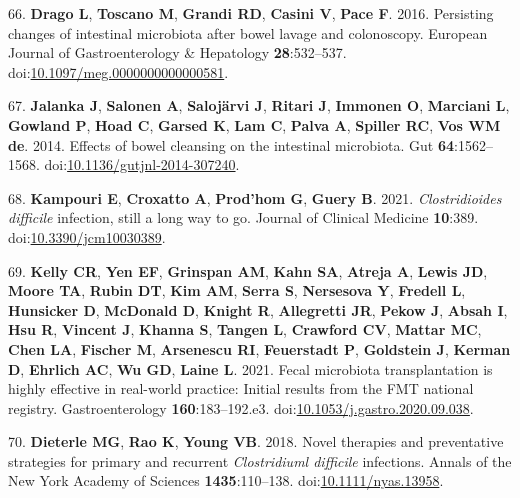 \documentclass[
  11pt,
]{article}
\begin{document}
\leavevmode\hypertarget{ref-Drago2016}{}%
66. \textbf{Drago L}, \textbf{Toscano M}, \textbf{Grandi RD},
\textbf{Casini V}, \textbf{Pace F}. 2016. Persisting changes of
intestinal microbiota after bowel lavage and colonoscopy. European
Journal of Gastroenterology \& Hepatology \textbf{28}:532--537.
doi:\href{https://doi.org/10.1097/meg.0000000000000581}{10.1097/meg.0000000000000581}.

\leavevmode\hypertarget{ref-Jalanka2014}{}%
67. \textbf{Jalanka J}, \textbf{Salonen A}, \textbf{Salojärvi J},
\textbf{Ritari J}, \textbf{Immonen O}, \textbf{Marciani L},
\textbf{Gowland P}, \textbf{Hoad C}, \textbf{Garsed K}, \textbf{Lam C},
\textbf{Palva A}, \textbf{Spiller RC}, \textbf{Vos WM de}. 2014. Effects
of bowel cleansing on the intestinal microbiota. Gut
\textbf{64}:1562--1568.
doi:\href{https://doi.org/10.1136/gutjnl-2014-307240}{10.1136/gutjnl-2014-307240}.

\leavevmode\hypertarget{ref-Kampouri2021}{}%
68. \textbf{Kampouri E}, \textbf{Croxatto A}, \textbf{Prod'hom G},
\textbf{Guery B}. 2021. \emph{Clostridioides difficile} infection, still
a long way to go. Journal of Clinical Medicine \textbf{10}:389.
doi:\href{https://doi.org/10.3390/jcm10030389}{10.3390/jcm10030389}.

\leavevmode\hypertarget{ref-Kelly2021}{}%
69. \textbf{Kelly CR}, \textbf{Yen EF}, \textbf{Grinspan AM},
\textbf{Kahn SA}, \textbf{Atreja A}, \textbf{Lewis JD}, \textbf{Moore
TA}, \textbf{Rubin DT}, \textbf{Kim AM}, \textbf{Serra S},
\textbf{Nersesova Y}, \textbf{Fredell L}, \textbf{Hunsicker D},
\textbf{McDonald D}, \textbf{Knight R}, \textbf{Allegretti JR},
\textbf{Pekow J}, \textbf{Absah I}, \textbf{Hsu R}, \textbf{Vincent J},
\textbf{Khanna S}, \textbf{Tangen L}, \textbf{Crawford CV},
\textbf{Mattar MC}, \textbf{Chen LA}, \textbf{Fischer M},
\textbf{Arsenescu RI}, \textbf{Feuerstadt P}, \textbf{Goldstein J},
\textbf{Kerman D}, \textbf{Ehrlich AC}, \textbf{Wu GD}, \textbf{Laine
L}. 2021. Fecal microbiota transplantation is highly effective in
real-world practice: Initial results from the FMT national registry.
Gastroenterology \textbf{160}:183--192.e3.
doi:\href{https://doi.org/10.1053/j.gastro.2020.09.038}{10.1053/j.gastro.2020.09.038}.

\leavevmode\hypertarget{ref-Dieterle2018}{}%
70. \textbf{Dieterle MG}, \textbf{Rao K}, \textbf{Young VB}. 2018. Novel
therapies and preventative strategies for primary and recurrent
\emph{Clostridiuml difficile} infections. Annals of the New York Academy
of Sciences \textbf{1435}:110--138.
doi:\href{https://doi.org/10.1111/nyas.13958}{10.1111/nyas.13958}.
\end{document}
